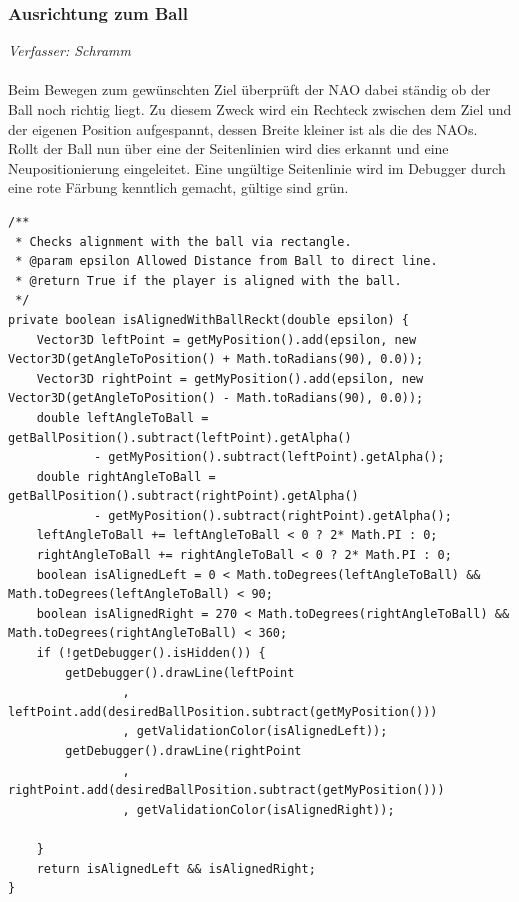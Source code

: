 \subsubsection{Ausrichtung zum Ball}
\textit{Verfasser: Schramm}\\
\\
Beim Bewegen zum gewünschten Ziel überprüft der NAO dabei ständig ob der Ball noch richtig liegt. Zu diesem Zweck wird ein Rechteck zwischen dem Ziel und der eigenen Position aufgespannt, dessen Breite kleiner ist als die des NAOs. Rollt der Ball nun über eine der Seitenlinien wird dies erkannt und eine Neupositionierung eingeleitet. Eine ungültige Seitenlinie wird im Debugger durch eine rote Färbung kenntlich gemacht, gültige sind grün.


\begin{lstlisting}[caption=Ausrichtung zum Ball, captionpos=b, label=lst:aligned-with-ball]
/**
 * Checks alignment with the ball via rectangle.
 * @param epsilon Allowed Distance from Ball to direct line.
 * @return True if the player is aligned with the ball.
 */
private boolean isAlignedWithBallReckt(double epsilon) {
    Vector3D leftPoint = getMyPosition().add(epsilon, new Vector3D(getAngleToPosition() + Math.toRadians(90), 0.0));
    Vector3D rightPoint = getMyPosition().add(epsilon, new Vector3D(getAngleToPosition() - Math.toRadians(90), 0.0));
    double leftAngleToBall = getBallPosition().subtract(leftPoint).getAlpha()
            - getMyPosition().subtract(leftPoint).getAlpha();
    double rightAngleToBall = getBallPosition().subtract(rightPoint).getAlpha()
            - getMyPosition().subtract(rightPoint).getAlpha();
    leftAngleToBall += leftAngleToBall < 0 ? 2* Math.PI : 0;
    rightAngleToBall += rightAngleToBall < 0 ? 2* Math.PI : 0;
    boolean isAlignedLeft = 0 < Math.toDegrees(leftAngleToBall) && Math.toDegrees(leftAngleToBall) < 90;
    boolean isAlignedRight = 270 < Math.toDegrees(rightAngleToBall) && Math.toDegrees(rightAngleToBall) < 360;
    if (!getDebugger().isHidden()) {
        getDebugger().drawLine(leftPoint
                , leftPoint.add(desiredBallPosition.subtract(getMyPosition()))
                , getValidationColor(isAlignedLeft));
        getDebugger().drawLine(rightPoint
                , rightPoint.add(desiredBallPosition.subtract(getMyPosition()))
                , getValidationColor(isAlignedRight));

    }
    return isAlignedLeft && isAlignedRight;
}
\end{lstlisting}

